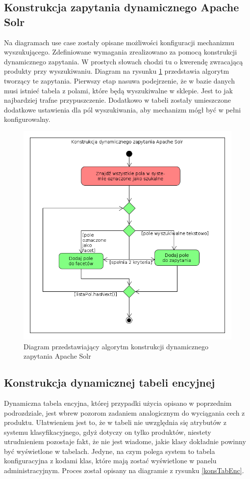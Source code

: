 \subsection{Konstrukcja zapytania dynamicznego Apache Solr}
Na diagramach use case zostały opisane możliwości konfiguracji mechanizmu wyszukującego. Zdefiniowane wymagania zrealizowano za pomocą konstrukcji dynamicznego zapytania. W prostych słowach chodzi tu o kwerendę zwracającą produkty przy wyszukiwaniu. Diagram na rysunku \ref{konsDynZapy} przedstawia algorytm tworzący te zapytania. Pierwszy etap nasuwa podejrzenie, że w bazie danych musi istnieć tabela z polami, które będą wyszukiwalne w sklepie. Jest to jak najbardziej trafne przypuszczenie. Dodatkowo w tabeli zostały umieszczone dodatkowe ustawienia dla pól wyszukiwania, aby mechanizm mógł być w pełni konfigurowalny. 
\begin{figure}
	\begin{center}
		\includegraphics[scale=0.5]{konsDynZapy.png}
	\end{center}
	\caption{{\color{black}Diagram przedstawiający algorytm konstrukcji dynamicznego zapytania Apache Solr}} \label{konsDynZapy}
\end{figure}
\subsection{Konstrukcja dynamicznej tabeli encyjnej}
Dynamiczna tabela encyjna, której przypadki użycia opisano w poprzednim podrozdziale, jest wbrew pozorom zadaniem analogicznym do wyciągania cech z produktu. Ułatwieniem jest to, że w tabeli nie uwzględnia się atrybutów z systemu klasyfikacyjnego, gdyż dotyczy on tylko produktów, niestety utrudnieniem pozostaje fakt, że nie jest wiadome, jakie klasy dokładnie powinny być wyświetlone w tabelach. Jedyne, na czym polega system to tabela konfiguracyjna z kodami klas, które mają zostać wyświetlone w panelu administracyjnym. Proces został opisany na diagramie z rysunku \ref{konsTabEnc}. 

